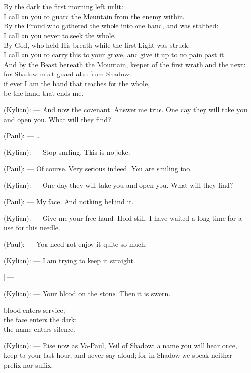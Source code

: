 \begin{room}
\begin{scripture}
By the dark the first morning left unlit: \\
I call on you to guard the Mountain from the enemy within. \\
By the Proud who gathered the whole into one hand, and was stabbed: \\
I call on you never to seek the whole. \\
By God, who held His breath while the first Light was struck: \\
I call on you to carry this to your grave, and give it up to no pain past it. \\
And by the Beast beneath the Mountain, keeper of the first wrath and the next: \\
for Shadow must guard also from Shadow: \\
if ever I am the hand that reaches for the whole, \\
be the hand that ends me.
\end{scripture}

(Kylian): --- And now the covenant. Answer me true. One day they will take you and open you. What will they find?

(Paul): --- \ldots{}

(Kylian): --- Stop smiling. This is no joke.

(Paul): --- Of course. Very serious indeed. You are smiling too.

(Kylian): --- One day they will take you and open you. What will they find?

(Paul): --- My face. And nothing behind it.

(Kylian): --- Give me your free hand. Hold still. I have waited a long time for a use for this needle.

(Paul): --- You need not enjoy it quite so much.

(Kylian): --- I am trying to keep it straight.

\centerline{[\,---\,]}

(Kylian): --- Your blood on the stone. Then it is sworn.

\begin{scripture}
blood enters service; \\
the face enters the dark; \\
the name enters silence.
\end{scripture}

(Kylian): --- Rise now as Va-Paul, Veil of Shadow: a name you will hear once, keep to your last hour, and never say aloud; for in Shadow we speak neither prefix nor suffix.


\end{room}
